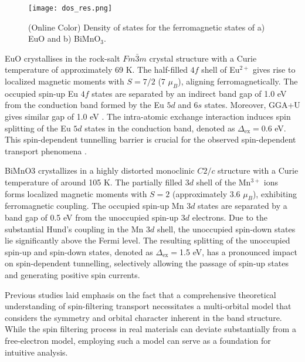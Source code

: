 \documentclass[10pt,pr,twocolumn,showpacs,amssymb,floatfix,superscriptaddress]{revtex4-1}
\begin{document}
\begin{figure}
\centering
\texttt{[image: dos\_res.png]}
\caption{(Online Color) Density of states for the ferromagnetic states of a) EuO and b) BiMnO$_{3}$.}
\label{fig:dos}
\end{figure}


EuO crystallises in the rock-salt $Fm\bar{3}m$ crystal structure with a Curie temperature of approximately 69 K. The half-filled $4f$ shell of Eu$^{2+}$ gives rise to localized magnetic moments with $S=7/2$ (7 $\mu_{B}$), aligning ferromagnetically. The occupied spin-up Eu $4f$ states are separated by an indirect band gap of 1.0 eV from the conduction band formed by the Eu $5d$ and 6$s$ states. 
Moreover, GGA+U gives similar gap of 1.0 eV \cite{Yang2013}. The intra-atomic exchange interaction induces spin splitting of the Eu $5d$ states in the conduction band, denoted as $\Delta_{\mathrm{ex}}=$0.6 eV. This spin-dependent tunnelling barrier is crucial for the observed spin-dependent transport phenomena \cite{Ingle2008}.






BiMnO3 crystallizes in a highly distorted monoclinic $C2/c$ structure with a Curie temperature of around 105 K. The partially filled $3d$ shell of the Mn$^{3+}$ ions forms localized magnetic moments with $S=2$ (approximately 3.6 $\mu_{B}$), exhibiting ferromagnetic coupling. The occupied spin-up Mn $3d$ states are separated by a band gap of 0.5 eV from the unoccupied spin-up $3d$ electrons. Due to the substantial Hund's coupling in the Mn $3d$ shell, the unoccupied spin-down states lie significantly above the Fermi level. The resulting splitting of the unoccupied spin-up and spin-down states, denoted as $\Delta_{\mathrm{ex}}=$1.5 eV, has a pronounced impact on spin-dependent tunnelling, selectively allowing the passage of spin-up states and generating positive spin currents.

Previous studies laid emphasis on the fact that a comprehensive theoretical understanding of spin-filtering transport necessitates a multi-orbital model that considers the symmetry and orbital character inherent in the band structure. While the spin filtering process in real materials can deviate substantially from a free-electron model, employing such a model can serve as a foundation for intuitive analysis.
\end{document}
